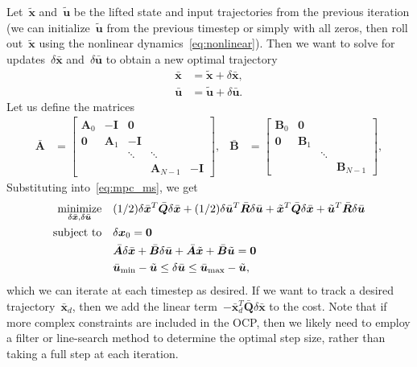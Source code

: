 \documentclass{article}
\begin{document}
Let~$\tilde{\bm{x}}$ and~$\tilde{\bm{u}}$ be the lifted state and input
trajectories from the previous iteration (we can initialize~$\tilde{\bm{u}}$
from the previous timestep or simply with all zeros, then roll
out~$\tilde{\bm{x}}$ using the nonlinear dynamics~\eqref{eq:nonlinear}). Then
we want to solve for updates~$\delta\bar{\bm{x}}$ and~$\delta\bar{\bm{u}}$ to
obtain a new optimal trajectory
\begin{align*}
  \bar{\bm{x}} &= \tilde{\bm{x}} + \delta\bar{\bm{x}}, \\
  \bar{\bm{u}} &= \tilde{\bm{u}} + \delta\bar{\bm{u}}.
\end{align*}
Let us define the matrices
\begin{align*}
  \bar{\bm{A}} &= \begin{bmatrix} \bm{A}_0 & -\bm{I} & \bm{0} \\ \bm{0} & \bm{A}_1 & -\bm{I} \\ & & \ddots & \ddots \\ & & & \bm{A}_{N-1} & -\bm{I} \end{bmatrix}, &
  \bar{\bm{B}} &= \begin{bmatrix} \bm{B}_0 & \bm{0} \\ \bm{0} & \bm{B}_1 \\ & & \ddots \\ & & & \bm{B}_{N-1} \end{bmatrix},
\end{align*}
Substituting into~\eqref{eq:mpc_ms}, we get
\begin{equation}\label{eq:mpc_nl}
  \begin{aligned}
    \operatorname*{minimize}_{\delta\bar{\bm{x}},\delta\bar{\bm{u}}} &\quad (1/2)\delta\bar{\bm{x}}^T\bar{\bm{Q}}\delta\bar{\bm{x}} + (1/2)\delta\bar{\bm{u}}^T\bar{\bm{R}}\delta\bar{\bm{u}} + \tilde{\bm{x}}^T\bar{\bm{Q}}\delta\bar{\bm{x}} + \tilde{\bm{u}}^T\bar{\bm{R}}\delta\bar{\bm{u}}\\
    \text{subject to} &\quad \delta\bm{x}_0 = \bm{0} \\
                      &\quad \bar{\bm{A}}\delta\bar{\bm{x}} + \bar{\bm{B}}\delta\bar{\bm{u}} + \bar{\bm{A}}\tilde{\bm{x}} + \bar{\bm{B}}\tilde{\bm{u}}= \bm{0} \\
                      &\quad \bar{\bm{u}}_{\min}-\tilde{\bm{u}} \leq \delta\bar{\bm{u}} \leq \bar{\bm{u}}_{\max}-\tilde{\bm{u}},
  \end{aligned}
\end{equation}
which we can iterate at each timestep as desired.
If we want to track a desired trajectory~$\bar{\bm{x}}_d$, then we add the
linear term~$-\bar{\bm{x}}_d^T\bar{\bm{Q}}\delta\bar{\bm{x}}$ to the cost. Note
that if more complex constraints are included in the OCP, then we likely need
to employ a filter or line-search method to determine the optimal step size,
rather than taking a full step at each iteration.
\end{document}
